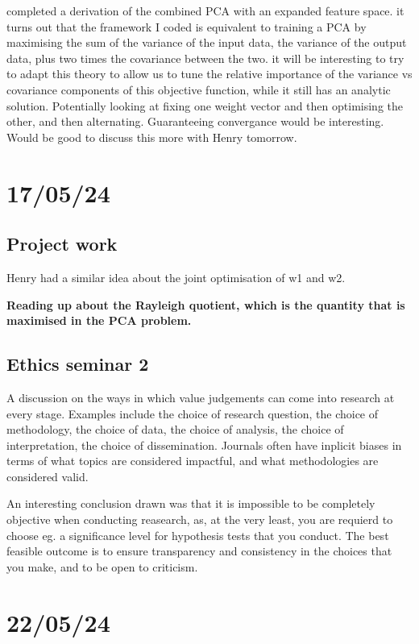 \documentclass[11pt,a4paper]{article}
\begin{document}
completed a derivation of the combined PCA with an expanded feature space.
it turns out that the framework I coded is equivalent to training a PCA by maximising the sum of the variance of the input data, the variance of the output data, plus two times the covariance between the two.
it will be interesting to try to adapt this theory to allow us to tune the relative importance of the variance vs covariance components of this objective function, while it still has an analytic solution.
Potentially looking at fixing one weight vector and then optimising the other, and then alternating.
Guaranteeing convergance would be interesting.
Would be good to discuss this more with Henry tomorrow.

\section{17/05/24}

\subsection{Project work}

Henry had a similar idea about the joint optimisation of w1 and w2.

\textbf{Reading up about the Rayleigh quotient, which is the quantity that is maximised in the PCA problem.}

\subsection{Ethics seminar 2}

A discussion on the ways in which value judgements can come into research at every stage.
Examples include the choice of research question, the choice of methodology, the choice of data, the choice of analysis, the choice of interpretation, the choice of dissemination.
Journals often have inplicit biases in terms of what topics are considered impactful, and what methodologies are considered valid.

An interesting conclusion drawn was that it is impossible to be completely objective when conducting reasearch, as, at the very least, you are requierd to choose eg. a significance level for hypothesis tests that you conduct.
The best feasible outcome is to ensure transparency and consistency in the choices that you make, and to be open to criticism.

\section{22/05/24}
\end{document}
